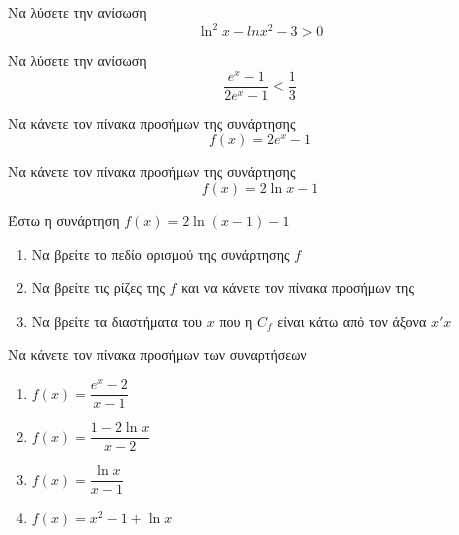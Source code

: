 \documentclass{../presentation}
\begin{document}
\begin{askisi}
  Να λύσετε την ανίσωση
  $$\ln^2x-ln x^2-3>0$$


\end{askisi}

\begin{askisi}
  Να λύσετε την ανίσωση $$\dfrac{e^x-1}{2e^x-1}<\dfrac{1}{3}$$


\end{askisi}

\begin{askisi}
  Να κάνετε τον πίνακα προσήμων της συνάρτησης $$f(x)=2e^x-1$$


\end{askisi}

\begin{askisi}
  Να κάνετε τον πίνακα προσήμων της συνάρτησης $$f(x)=2\ln x-1$$


\end{askisi}

\begin{askisi}
  Έστω η συνάρτηση $f(x)=2\ln (x-1)-1$
  \begin{enumerate}
    \item<1-> Να βρείτε το πεδίο ορισμού της συνάρτησης $f$
    \item<2-> Να βρείτε τις ρίζες της $f$ και να κάνετε τον πίνακα προσήμων της
    \item<3-> Να βρείτε τα διαστήματα του $x$ που η $C_f$ είναι κάτω από τον άξονα $x'x$
  \end{enumerate}


\end{askisi}

\begin{askisi}
  Να κάνετε τον πίνακα προσήμων των συναρτήσεων
  \begin{enumerate}
    \item<1-> $f(x)=\dfrac{e^x-2}{x-1}$
    \item<2-> $f(x)=\dfrac{1-2\ln x}{x-2}$
    \item<3-> $f(x)=\dfrac{\ln x}{x-1}$
    \item<4-> $f(x)=x^2-1+\ln x$
  \end{enumerate}


\end{askisi}
\end{document}
